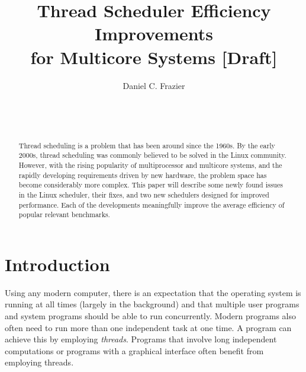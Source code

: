 \documentclass{sig-alternate}
\begin{document}

\title{Thread Scheduler Efficiency Improvements \\ for Multicore Systems [Draft]}


\author{
\alignauthor
Daniel C. Frazier\\
	\\
	\\
	\\
}
\maketitle


\begin{abstract}

Thread scheduling is a problem that has been around since the 1960s. By the early 2000s, thread scheduling was commonly believed to be solved in the Linux community. However, with the rising popularity of multiprocessor and multicore systems, and the rapidly developing requirements driven by new hardware, the problem space has become considerably more complex. This paper will describe some newly found issues in the Linux scheduler, their fixes, and two new schedulers designed for improved performance. Each of the developments meaningfully improve the average efficiency of popular relevant benchmarks.

\end{abstract}


\section{Introduction}
\label{sec:intro}

Using any modern computer, there is an expectation that the operating system is running at all times (largely in the background) and that multiple user programs and system programs should be able to run concurrently. Modern programs also often need to run more than one independent task at one time. A program can achieve this by employing \emph{threads}. Programs that involve long independent computations or programs with a graphical interface often benefit from employing threads.
\end{document}
